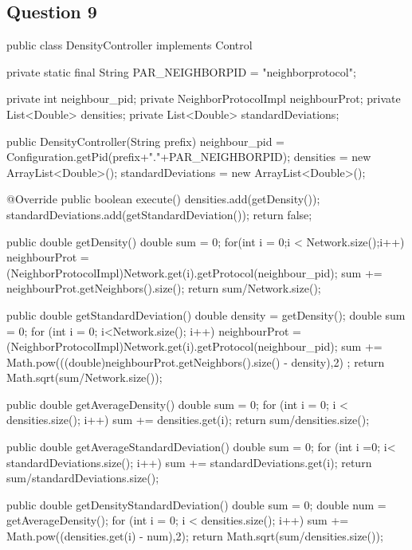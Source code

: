 \documentclass[10pt]{report}
\begin{document}
\subsection{Question 9}

\noindent\begin{minipage}{\textwidth}
\begin{shaded}
\begin{boxedlisting}
public class DensityController implements Control{

	private static final String PAR_NEIGHBORPID = "neighborprotocol";

	private int neighbour_pid;
	private NeighborProtocolImpl neighbourProt;
	private List<Double> densities;
	private List<Double> standardDeviations;
	
	public DensityController(String prefix) {
		neighbour_pid = Configuration.getPid(prefix+"."+PAR_NEIGHBORPID);
		densities = new ArrayList<Double>();
		standardDeviations  = new ArrayList<Double>();
	}

	@Override
	public boolean execute() {
		densities.add(getDensity());
		standardDeviations.add(getStandardDeviation());
		return false;
	}

	public double getDensity() {
		double sum = 0;
		for(int i = 0;i < Network.size();i++) {
			neighbourProt = (NeighborProtocolImpl)Network.get(i).getProtocol(neighbour_pid);
			sum += neighbourProt.getNeighbors().size();
		}
		return sum/Network.size();
	}
	
	public double getStandardDeviation() {
		double density = getDensity();
		double sum = 0;
		for (int i = 0; i<Network.size(); i++) {
			neighbourProt = (NeighborProtocolImpl)Network.get(i).getProtocol(neighbour_pid);
			 sum += Math.pow(((double)neighbourProt.getNeighbors().size() - density),2) ;
		}
		return Math.sqrt(sum/Network.size());
	}
	
	public double getAverageDensity() {
		double sum = 0;
		for (int i = 0; i < densities.size(); i++) {
			sum += densities.get(i);
		}
		return sum/densities.size();
	}
	
	public double getAverageStandardDeviation() {
		double sum = 0;
		for (int i =0; i< standardDeviations.size(); i++) {
			sum += standardDeviations.get(i);
		}
		return sum/standardDeviations.size();
	}
	
	public double getDensityStandardDeviation() {
		double sum = 0;
		double num = getAverageDensity();
		for (int i = 0; i < densities.size(); i++) {
			sum += Math.pow((densities.get(i) - num),2);
		}
		return Math.sqrt(sum/densities.size());
	}	
}
\end{boxedlisting}
\end{shaded}
\end{minipage}
\end{document}
